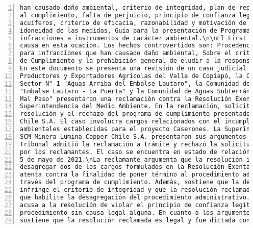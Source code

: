 \begin{Verbatim}[frame=lines, label=Elavoración propia -  Ejemplo de Contexto enviado por el Chatbot a OpenAI
				, fontsize=\scriptsize, numbers=left
				, baselinestretch=0.4
				, formatcom=\color{gray}]
han causado daño ambiental, criterio de integridad, plan de reparación ambiental, incentivos
al cumplimiento, falta de perjuicio, principio de confianza legitima, calidad de aguas,
acuíferos, criterio de eficacia, razonabilidad y motivación de la resolución de la SMA,
idoneidad de las medidas, Guía para la presentación de Programas de Cumplimiento por
infracciones a instrumentos de carácter ambiental.\n\nEl First Environmental Court Rechaza la
causa en esta ocacion. Los hechos controvertidos son: Procedencia del Programa de Cumplimiento
para infracciones que han causado daño ambiental, Sobre el criterio de eficacia del Programa
de Cumplimiento y la prohibición general de eludir a la responsabilidad.\n\nY el resumen es:
En este documento se presenta una revisión de un caso judicial en el que la Asociación de
Productores y Exportadores Agrícolas del Valle de Copiapó, la Comunidad de Aguas Subterráneas
Sector N° 1 "Aguas Arriba del Embalse Lautaro", la Comunidad de Aguas Subterráneas Sector N°2
"Embalse Lautaro - La Puerta" y la Comunidad de Aguas Subterráneas Sector N° 3 "La Puerta -
Mal Paso" presentaron una reclamación contra la Resolución Exenta Nº 15/Rol D-018-2019 de la
Superintendencia del Medio Ambiente. En la reclamación, solicitan la invalidación de la
resolución y el rechazo del programa de cumplimiento presentado por SCM Minera Lumina Copper
Chile S.A. El caso involucra cargos relacionados con el incumplimiento de condiciones
ambientales establecidas para el proyecto Caserones. La Superintendencia del Medio Ambiente y
SCM Minera Lumina Copper Chile S.A. presentaron sus argumentos en contra de la reclamación. El
Tribunal admitió la reclamación a trámite y rechazó la solicitud de medida cautelar presentada
por los reclamantes. El caso se encuentra en estado de relación y se llevó a cabo una vista el
5 de mayo de 2021.\nLa reclamante argumenta que la resolución impugnada infringe la ley al
desagregar dos de los cargos formulados en la Resolución Exenta N° 1/D-018-2019, lo cual
atenta contra la finalidad de poner término al procedimiento administrativo sancionador a
través del programa de cumplimiento. Además, sostiene que la desagregación de los cargos
infringe el criterio de integridad y que la resolución reclamada carece de una causal legal
que habilite la desagregación del procedimiento administrativo. Por otro lado, la reclamante
acusa a la resolución de violar el principio de confianza legítima al desagregar el
procedimiento sin causa legal alguna. En cuanto a los argumentos de la reclamada, esta
sostiene que la resolución reclamada es legal y fue dictada conforme a la normativa vigente.

\end{Verbatim}

